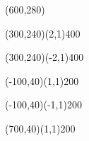 \documentclass[12pt]{article}
\begin{document}
\begin{figure}[htb]
\hspace*{\fill}
\begin{egame}(600,280)

\renewcommand{\egarrowstyle}{}

%
\putbranch(300,240)(2,1){400}

\renewcommand{\egarrowstyle}{}

\putbranch(300,240)(-2,1){400}

\renewcommand{\egarrowstyle}{e}

\putbranch(-100,40)(1,1){200}

\renewcommand{\egarrowstyle}{}

\putbranch(-100,40)(-1,1){200}

\renewcommand{\egarrowstyle}{}

\putbranch(700,40)(1,1){200}

\renewcommand{\egarrowstyle}{e}


\end{egame}
\end{figure}
\end{document}
